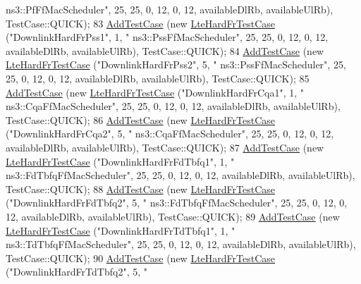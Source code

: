 \begin{DoxyCode}
{      ns3::PfFfMacScheduler"}, 25, 25, 0, 12, 0, 12, availableDlRb, availableUlRb), TestCase::QUICK);
83   \hyperlink{classns3_1_1TestCase_a3718088e3eefd5d6454569d2e0ddd835}{AddTestCase} (\textcolor{keyword}{new} \hyperlink{classLteHardFrTestCase}{LteHardFrTestCase} (\textcolor{stringliteral}{"DownlinkHardFrPss1"}, 1, \textcolor{stringliteral}{"
      ns3::PssFfMacScheduler"}, 25, 25, 0, 12, 0, 12, availableDlRb, availableUlRb), TestCase::QUICK);
84   \hyperlink{classns3_1_1TestCase_a3718088e3eefd5d6454569d2e0ddd835}{AddTestCase} (\textcolor{keyword}{new} \hyperlink{classLteHardFrTestCase}{LteHardFrTestCase} (\textcolor{stringliteral}{"DownlinkHardFrPss2"}, 5, \textcolor{stringliteral}{"
      ns3::PssFfMacScheduler"}, 25, 25, 0, 12, 0, 12, availableDlRb, availableUlRb), TestCase::QUICK);
85   \hyperlink{classns3_1_1TestCase_a3718088e3eefd5d6454569d2e0ddd835}{AddTestCase} (\textcolor{keyword}{new} \hyperlink{classLteHardFrTestCase}{LteHardFrTestCase} (\textcolor{stringliteral}{"DownlinkHardFrCqa1"}, 1, \textcolor{stringliteral}{"
      ns3::CqaFfMacScheduler"}, 25, 25, 0, 12, 0, 12, availableDlRb, availableUlRb), TestCase::QUICK);
86   \hyperlink{classns3_1_1TestCase_a3718088e3eefd5d6454569d2e0ddd835}{AddTestCase} (\textcolor{keyword}{new} \hyperlink{classLteHardFrTestCase}{LteHardFrTestCase} (\textcolor{stringliteral}{"DownlinkHardFrCqa2"}, 5, \textcolor{stringliteral}{"
      ns3::CqaFfMacScheduler"}, 25, 25, 0, 12, 0, 12, availableDlRb, availableUlRb), TestCase::QUICK);
87   \hyperlink{classns3_1_1TestCase_a3718088e3eefd5d6454569d2e0ddd835}{AddTestCase} (\textcolor{keyword}{new} \hyperlink{classLteHardFrTestCase}{LteHardFrTestCase} (\textcolor{stringliteral}{"DownlinkHardFrFdTbfq1"}, 1, \textcolor{stringliteral}{"
      ns3::FdTbfqFfMacScheduler"}, 25, 25, 0, 12, 0, 12, availableDlRb, availableUlRb), TestCase::QUICK);
88   \hyperlink{classns3_1_1TestCase_a3718088e3eefd5d6454569d2e0ddd835}{AddTestCase} (\textcolor{keyword}{new} \hyperlink{classLteHardFrTestCase}{LteHardFrTestCase} (\textcolor{stringliteral}{"DownlinkHardFrFdTbfq2"}, 5, \textcolor{stringliteral}{"
      ns3::FdTbfqFfMacScheduler"}, 25, 25, 0, 12, 0, 12, availableDlRb, availableUlRb), TestCase::QUICK);
89   \hyperlink{classns3_1_1TestCase_a3718088e3eefd5d6454569d2e0ddd835}{AddTestCase} (\textcolor{keyword}{new} \hyperlink{classLteHardFrTestCase}{LteHardFrTestCase} (\textcolor{stringliteral}{"DownlinkHardFrTdTbfq1"}, 1, \textcolor{stringliteral}{"
      ns3::TdTbfqFfMacScheduler"}, 25, 25, 0, 12, 0, 12, availableDlRb, availableUlRb), TestCase::QUICK);
90   \hyperlink{classns3_1_1TestCase_a3718088e3eefd5d6454569d2e0ddd835}{AddTestCase} (\textcolor{keyword}{new} \hyperlink{classLteHardFrTestCase}{LteHardFrTestCase} (\textcolor{stringliteral}{"DownlinkHardFrTdTbfq2"}, 5, \textcolor{stringliteral}{"
}
\end{DoxyCode}
